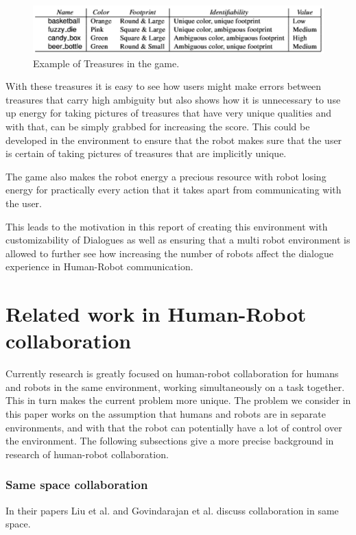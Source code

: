 \documentclass{report}
\begin{document}
        \begin{figure}[!ht]
          
          \centering
            \includegraphics[width=1.02\textwidth]{figures/treasures.png}
            \caption{Example of Treasures in the game.}
        \end{figure}

      With these treasures it is easy to see how users might make errors between treasures that carry high ambiguity but also shows how it is unnecessary to use up energy for taking pictures of treasures that have very unique qualities and with that, can be simply grabbed for increasing the score. This could be developed in the environment to ensure that the robot makes sure that the user is certain of taking pictures of treasures that are implicitly unique.

      The game also makes the robot energy a precious resource with robot losing energy for practically every action that it takes apart from communicating with the user.

      This leads to the motivation in this report of creating this environment with customizability of Dialogues as well as ensuring that a multi robot environment is allowed to further see how increasing the number of robots affect the dialogue experience in Human-Robot communication.

    \section{Related work in Human-Robot collaboration}
      Currently research is greatly focused on human-robot collaboration for humans and robots in the same environment, working simultaneously on a task together. This in turn makes the current problem more unique. The problem we consider in this paper works on the assumption that humans and robots are in separate environments, and with that the robot can potentially have a lot of control over the environment. The following subsections give a more precise background in research of human-robot collaboration.

      \subsubsection{Same space collaboration}
        In their papers Liu et al.\cite{ChangLiu} and Govindarajan et al.\cite{Vijay} discuss collaboration in same space. 
\end{document}

